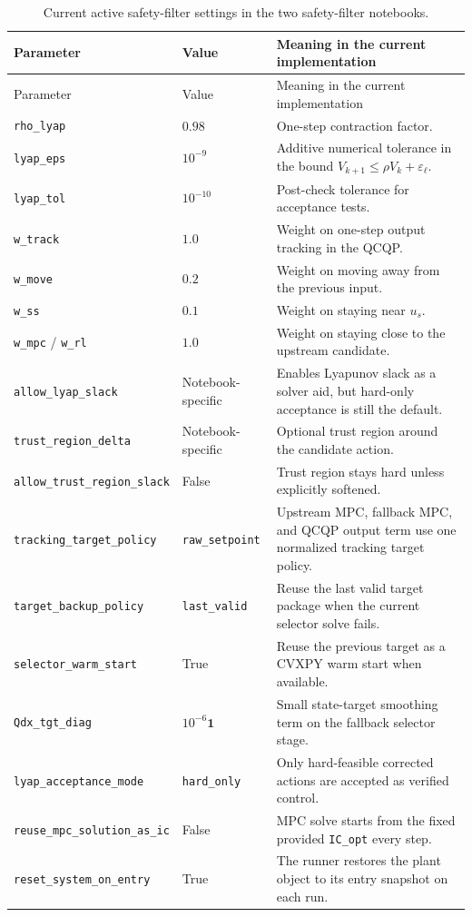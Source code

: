 \documentclass[11pt]{article}
\begin{document}
\begin{longtable}{>{\raggedright\arraybackslash}p{} >{\raggedright\arraybackslash}p{} >{\raggedright\arraybackslash}p{}}
\caption{Current active safety-filter settings in the two safety-filter notebooks.}
\label{tab:filter-active}\\
\toprule
Parameter & Value & Meaning in the current implementation \\
\midrule
\endfirsthead
\toprule
Parameter & Value & Meaning in the current implementation \\
\midrule
\endhead
\texttt{rho\_lyap} & $0.98$ & One-step contraction factor. \\
\texttt{lyap\_eps} & $10^{-9}$ & Additive numerical tolerance in the bound $V_{k+1} \le \rho V_k + \varepsilon_\ell$. \\
\texttt{lyap\_tol} & $10^{-10}$ & Post-check tolerance for acceptance tests. \\
\texttt{w\_track} & $1.0$ & Weight on one-step output tracking in the QCQP. \\
\texttt{w\_move} & $0.2$ & Weight on moving away from the previous input. \\
\texttt{w\_ss} & $0.1$ & Weight on staying near $u_s$. \\
\texttt{w\_mpc} / \texttt{w\_rl} & $1.0$ & Weight on staying close to the upstream candidate. \\
\texttt{allow\_lyap\_slack} & Notebook-specific & Enables Lyapunov slack as a solver aid, but hard-only acceptance is still the default. \\
\texttt{trust\_region\_delta} & Notebook-specific & Optional trust region around the candidate action. \\
\texttt{allow\_trust\_region\_slack} & False & Trust region stays hard unless explicitly softened. \\
\texttt{tracking\_target\_policy} & \texttt{raw\_setpoint} & Upstream MPC, fallback MPC, and QCQP output term use one normalized tracking target policy. \\
\texttt{target\_backup\_policy} & \texttt{last\_valid} & Reuse the last valid target package when the current selector solve fails. \\
\texttt{selector\_warm\_start} & True & Reuse the previous target as a CVXPY warm start when available. \\
\texttt{Qdx\_tgt\_diag} & $10^{-6}\mathbf{1}$ & Small state-target smoothing term on the fallback selector stage. \\
\texttt{lyap\_acceptance\_mode} & \texttt{hard\_only} & Only hard-feasible corrected actions are accepted as verified control. \\
\texttt{reuse\_mpc\_solution\_as\_ic} & False & MPC solve starts from the fixed provided \texttt{IC\_opt} every step. \\
\texttt{reset\_system\_on\_entry} & True & The runner restores the plant object to its entry snapshot on each run. \\
\bottomrule
\end{longtable}
\end{document}
